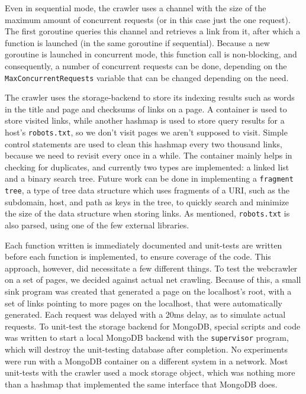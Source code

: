 \documentclass[]{article}
\begin{document}
Even in sequential mode, the crawler uses a channel with the size of the
maximum amount of concurrent requests (or in this case just the one
request). The first goroutine queries this channel and retrieves a link
from it, after which a function is launched (in the same goroutine if
sequential). Because a new goroutine is launched in concurrent mode,
this function call is non-blocking, and consequently, a number of
concurrent requests can be done, depending on the
\texttt{MaxConcurrentRequests} variable that can be changed depending on
the need.

The crawler uses the storage-backend to store its indexing results such
as words in the title and page and checksums of links on a page. A
container is used to store visited links, while another hashmap is used
to store query results for a host's \texttt{robots.txt}, so we don't
visit pages we aren't supposed to visit. Simple control statements are
used to clean this hashmap every two thousand links, because we need to
revisit every once in a while. The container mainly helps in checking
for duplicates, and currently two types are implemented: a linked list
and a binary search tree. Future work can be done in implementing a
\texttt{fragment tree}, a type of tree data structure which uses
fragments of a URI, such as the subdomain, host, and path as keys in the
tree, to quickly search and minimize the size of the data structure when
storing links. As mentioned, \texttt{robots.txt} is also parsed, using
one of the few external libraries.

Each function written is immediately documented and unit-tests are
written before each function is implemented, to ensure coverage of the
code. This approach, however, did necessitate a few different things. To
test the webcrawler on a set of pages, we decided against actual net
crawling. Because of this, a small sink program was created that
generated a page on the localhost's root, with a set of links pointing
to more pages on the localhost, that were automatically generated. Each
request was delayed with a 20ms delay, as to simulate actual requests.
To unit-test the storage backend for MongoDB, special scripts and code
was written to start a local MongoDB backend with the
\texttt{supervisor} program, which will destroy the unit-testing
database after completion. No experiments were run with a MongoDB
container on a different system in a network. Most unit-tests with the
crawler used a mock storage object, which was nothing more than a
hashmap that implemented the same interface that MongoDB does.
\end{document}
